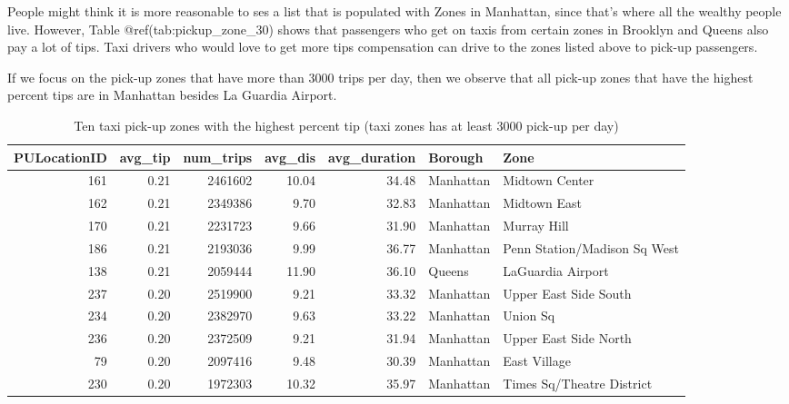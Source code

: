\documentclass[12pt,twoside]{reedthesis}
\newenvironment{Shaded}{\begin{snugshade}}{\end{snugshade}}
\newcommand{\KeywordTok}[1]{\textcolor[rgb]{0.13,0.29,0.53}{\textbf{#1}}}
\newcommand{\DecValTok}[1]{\textcolor[rgb]{0.00,0.00,0.81}{#1}}
\newcommand{\StringTok}[1]{\textcolor[rgb]{0.31,0.60,0.02}{#1}}
\newcommand{\OperatorTok}[1]{\textcolor[rgb]{0.81,0.36,0.00}{\textbf{#1}}}
\newcommand{\NormalTok}[1]{#1}
\theoremstyle{definition}
\theoremstyle{definition}
\theoremstyle{definition}
\theoremstyle{remark}
\begin{document}
People might think it is more reasonable to ses a list that is populated
with Zones in Manhattan, since that's where all the wealthy people live.
However, Table @ref(tab:pickup\_zone\_30) shows that passengers who get
on taxis from certain zones in Brooklyn and Queens also pay a lot of
tips. Taxi drivers who would love to get more tips compensation can
drive to the zones listed above to pick-up passengers.

If we focus on the pick-up zones that have more than 3000 trips per day,
then we observe that all pick-up zones that have the highest percent
tips are in Manhattan besides La Guardia Airport.
\begin{Shaded}
\end{Shaded}
\begin{table}

\caption{\label{tab:unnamed-chunk-36}Ten taxi pick-up zones with the highest percent tip  (taxi zones has at least 3000 pick-up per day)}
\centering
\begin{tabular}[t]{r|r|r|r|r|l|l}
\hline
PULocationID & avg\_tip & num\_trips & avg\_dis & avg\_duration & Borough & Zone\\
\hline
161 & 0.21 & 2461602 & 10.04 & 34.48 & Manhattan & Midtown Center\\
\hline
162 & 0.21 & 2349386 & 9.70 & 32.83 & Manhattan & Midtown East\\
\hline
170 & 0.21 & 2231723 & 9.66 & 31.90 & Manhattan & Murray Hill\\
\hline
186 & 0.21 & 2193036 & 9.99 & 36.77 & Manhattan & Penn Station/Madison Sq West\\
\hline
138 & 0.21 & 2059444 & 11.90 & 36.10 & Queens & LaGuardia Airport\\
\hline
237 & 0.20 & 2519900 & 9.21 & 33.32 & Manhattan & Upper East Side South\\
\hline
234 & 0.20 & 2382970 & 9.63 & 33.22 & Manhattan & Union Sq\\
\hline
236 & 0.20 & 2372509 & 9.21 & 31.94 & Manhattan & Upper East Side North\\
\hline
79 & 0.20 & 2097416 & 9.48 & 30.39 & Manhattan & East Village\\
\hline
230 & 0.20 & 1972303 & 10.32 & 35.97 & Manhattan & Times Sq/Theatre District\\
\hline
\end{tabular}
\end{table}
\end{document}
